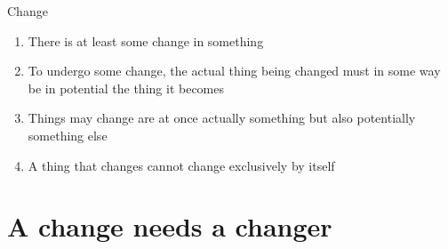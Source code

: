 \documentclass[xcolor=dvipsnames]{beamer}
\begin{document}
\begin{frame}[fragile]{Change}
  \begin{enumerate}
  \item There is at least some change in something \vspace{5mm}
  \item To undergo some change, the actual thing being changed must in some way be in potential the thing it becomes \vspace{5mm}
  \item Things may change are at once actually something but also potentially something else \vspace{5mm}
  \item A thing that changes cannot change exclusively by itself \vspace{5mm}
  \end{enumerate}
\end{frame}


\section{A change needs a changer}
\end{document}
